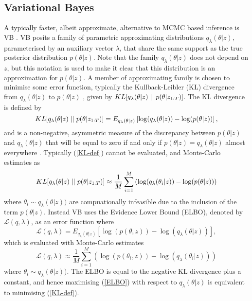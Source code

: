 \documentclass[12pt,a4paper]{article}\usepackage[]{graphicx}\usepackage[]{color}
\begin{document}
\subsection{Variational Bayes}
\label{subsec:VB}

A typically faster, albeit approximate, alternative to MCMC based inference is VB \citep{Jordan1999}. VB posits a family of parametric approximating distributions $q_{\lambda}(\theta | z)$, parameterised by an auxiliary vector $\lambda$, that share the same support as the true posterior distribution $p(\theta | z)$. Note that the family $q_{\lambda}(\theta | z)$ does not depend on $z$, but this notation is used to make it clear that this distribution is an approximation for $p(\theta | z)$. A member of approximating family is chosen to minimise some error function, typically the Kullback-Leibler (KL) divergence from $q_{\lambda}(\theta | z)$ to $p(\theta | z)$ \citep{Kullback1951}, given by $KL[q_{\lambda}(\theta | z)\hspace{.1cm}||\hspace{.1cm}p(\theta | z_{1:T})]$. The KL divergence is defined by
\begin{equation}
\label{KL-def}
KL[q_{\lambda}(\theta | z)\hspace{.1cm}||\hspace{.1cm}p(\theta | z_{1:T})] = E_{q_{\lambda}(\theta | z)} \left[ \log(q_{\lambda}(\theta | z)) - \log(p(\theta | z)) \right],
\end{equation}
and is a non-negative, asymmetric measure of the discrepancy between $p(\theta | z)$ and $q_{\lambda}(\theta | z)$  that will be equal to zero if and only if $p(\theta | z) = q_{\lambda}(\theta | z)$ almost everywhere \citep{Bishop2006}.
Typically (\ref{KL-def}) cannot be evaluated, and Monte-Carlo estimates as
\begin{equation}
\label{KL-MC}
KL[q_{\lambda}(\theta | z)\hspace{.1cm}||\hspace{.1cm}p(\theta | z_{1:T})] \approx \frac{1}{M}\sum_{i=1}^M \left(\log(q_{\lambda}(\theta_i |z)) - \log(p(\theta | z)) \right)
\end{equation}
where $\theta_i \sim q_{\lambda}(\theta |z))$ are compuationally infeasible due to the inclusion of the term $p(\theta | z)$. Instead VB uses the Evidence Lower Bound (ELBO), denoted by $\mathcal{L}(q, \lambda)$, as an error function where
\begin{equation}
\label{ELBO}
\mathcal{L}(q, \lambda) = E_{q_{\lambda}(\theta |z)} \left[\log(p(\theta, z)) - \log(q_{\lambda}(\theta |z))\right],
\end{equation}
which is evaluated with Monte-Carlo estimates
\begin{equation}
\label{ELBO-MC}
\mathcal{L}(q, \lambda) \approx \frac{1}{M} \sum_{i=1}^M \left(\log(p(\theta_i, z)) - \log(q_{\lambda}(\theta_i |z)) \right)
\end{equation}
where $\theta_i \sim q_{\lambda}(\theta |z))$. The ELBO is equal to the negative KL divergence plus a constant, and hence maximising (\ref{ELBO}) with respect to $q_{\lambda}(\theta | z)$ is equivalent to minimising (\ref{KL-def}).
\end{document}
